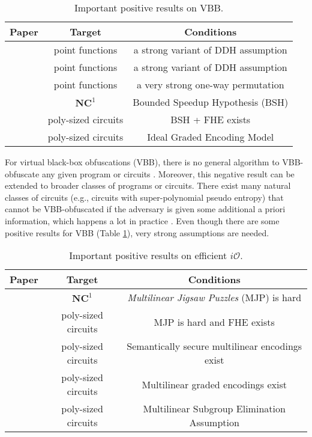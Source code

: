 \documentclass[12pt]{article}
\newcommand{\io}{i\mathcal{O}}
\theoremstyle{definition}
\begin{document}
\begin{table}[!t]
\centering
\begin{tabular}{c|c|c}
\hline
Paper & Target & Conditions \\
\hline
\cite{canetti1997towards} & point functions & a strong variant of DDH assumption \\
\cite{canetti1998perfectly} & point functions & a strong variant of DDH assumption \\
\cite{wee2005obfuscating} & point functions & a very strong one-way permutation \\
\cite{brakerski2014virtual} & $\mathbf{NC}^1$ & Bounded Speedup Hypothesis (BSH) \\
\cite{brakerski2014virtual} & poly-sized circuits & BSH + FHE exists \\
\cite{barak2014protecting} & poly-sized circuits & Ideal Graded Encoding Model \\
\hline
\end{tabular}
\caption{Important positive results on VBB.}
\label{tab:vbb}
\end{table}
For virtual black-box obfuscations (VBB), there is no general algorithm to VBB-obfuscate any given program or circuits \cite{barak2001possibility, barak2012possibility}. Moreover, this negative result can be extended to broader classes of programs or circuits. There exist many natural classes of circuits (e.g., circuits with super-polynomial pseudo entropy) that cannot be VBB-obfuscated if the adversary is given some additional a priori information, which happens a lot in practice \cite{goldwasser2005impossibility, bitansky2014impossibility}. Even though there are some positive results for VBB (Table \ref{tab:vbb}), very strong assumptions are needed.

\begin{table}[!t]
\centering
\begin{tabular}{c|c|c}
\hline
Paper & Target & Conditions \\
\hline
\cite{garg2013candidate} & $\mathbf{NC}^1$ & \emph{Multilinear Jigsaw Puzzles} (MJP) is hard \\
\cite{garg2013candidate} & poly-sized circuits & MJP is hard and FHE exists \\
\cite{pass2014} & poly-sized circuits & Semantically secure multilinear encodings exist \\
\cite{bitansky2015} & poly-sized circuits & Multilinear graded encodings exist \\
\cite{gentry2015} & poly-sized circuits & Multilinear Subgroup Elimination Assumption \\
\hline
\end{tabular}
\caption{Important positive results on efficient $\io$.}
\label{tab:pos}
\end{table}
\end{document}
